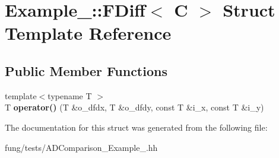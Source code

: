 \hypertarget{structExample__3_1_1FDiff}{\section{Example\-\_\-:\-:F\-Diff$<$ C $>$ Struct Template Reference}
\label{structExample__3_1_1FDiff}
}
\subsection*{Public Member Functions}
\begin{DoxyCompactItemize}
\item 
\hypertarget{structExample__3_1_1FDiff_ad72a19157aef8110a55462ebcc85d988}{{\footnotesize template$<$typename T $>$ }\\T {\bfseries operator()} (T \&o\-\_\-dfdx, T \&o\-\_\-dfdy, const T \&i\-\_\-x, const T \&i\-\_\-y)}\label{structExample__3_1_1FDiff_ad72a19157aef8110a55462ebcc85d988}

\end{DoxyCompactItemize}


The documentation for this struct was generated from the following file\-:\begin{DoxyCompactItemize}
\item 
fung/tests/A\-D\-Comparison\-\_\-\-Example\-\_.\-hh\end{DoxyCompactItemize}
